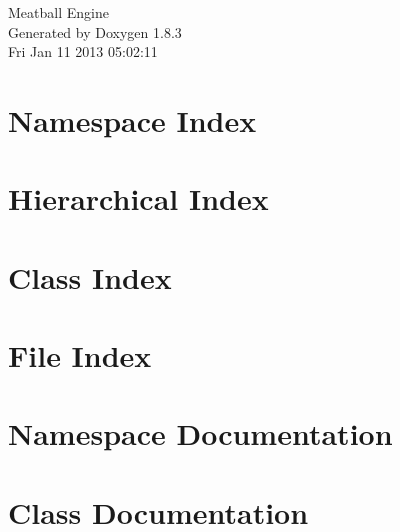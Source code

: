 \documentclass{book}
\begin{document}
\hypersetup{pageanchor=false,citecolor=blue}
\begin{titlepage}
\vspace*{7cm}
\begin{center}
{\Large Meatball Engine }\\
\vspace*{1cm}
{\large Generated by Doxygen 1.8.3}\\
\vspace*{0.5cm}
{\small Fri Jan 11 2013 05:02:11}\\
\end{center}
\end{titlepage}
\clearemptydoublepage
{}
\tableofcontents
\clearemptydoublepage
{}
\hypersetup{pageanchor=true,citecolor=blue}
\chapter{Namespace Index}

\chapter{Hierarchical Index}

\chapter{Class Index}

\chapter{File Index}

\chapter{Namespace Documentation}

\chapter{Class Documentation}
























\end{document}
